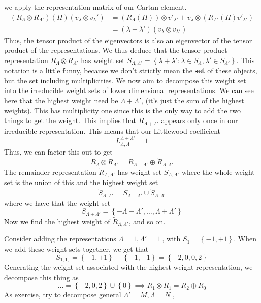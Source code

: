 we apply the representation matrix of our Cartan element. 
\begin{align*}
	( R _{ \Lambda } \otimes R _{ \Lambda ' })  ( H ) ( v _ \lambda \otimes v _{ \lambda } ' ) 
	&=  ( R _ \Lambda ( H ) ) \otimes v ' _{ \lambda '   } + v _ \lambda \otimes ( R _{ \Lambda ' 
	} ( H ) v ' _{ \lambda ' } ) \\
					&=  ( \lambda + \lambda ' ) ( v _ \lambda \otimes v _{ \lambda ' } )
\end{align*}
Thus, the tensor 
product of the eigenvectors is also an eigenvector 
of the tensor product of the representations. 
We thus deduce that the tensor product representation 
$ R_{ \Lambda } \otimes R _{ \Lambda ' } $ has weight set 
$ S _{ \Lambda , \Lambda ' }  = \left\{  \lambda + \lambda ' 
: \lambda \in S _{ \Lambda } , \lambda ' \in S _{ \Lambda ' } \right\} $. 
This notation is a little funny, because we don't strictly 
mean the \textbf{set} of these objects, but the set including multiplicities. 
We now aim to decompose this weight set 
into the irreducible weight sets of lower dimensional representations.  
We can see here that the highest weight need be $ \Lambda   + \Lambda ' $, 
(it's just the sum of the highest weights). This has multiplicity one since 
this is the only way to add the two things to get the weight. 
This implies that $ R _{ \Lambda + \Lambda ' } $ appears only 
once in our irreducible representation. This means 
that our Littlewood coefficient 
\[
 L ^{ \Lambda + \Lambda ' } _{ \Lambda , \Lambda }  =1 
\] Thus, we can factor this out to get 
\[
 R_{ \Lambda } \otimes R_{ \Lambda ' } = R _{ \Lambda + \Lambda ' } \oplus \tilde{ R } _{ \Lambda , \Lambda ' } 
\] The remainder representation 
$ \tilde{ R  } _{ \Lambda, \Lambda ' }  $ has weight set 
$  \tilde{ S } _{ \Lambda , \Lambda ' }  $ where 
the whole weight set is the union of this and the highest weight set 
\[
 \tilde{ S } _{ \Lambda , \Lambda ' }  = S _{ \Lambda + \Lambda'   }  \cup \tilde{ S  } _{ \Lambda, \Lambda ' }
\] where we have that 
the weight set 
\[
 S _{ \Lambda + \Lambda'  }  = \left\{   - \Lambda - \Lambda ' , \dots , \Lambda + \Lambda '  \right\} 
\]  Now we find the highest weight of $ \tilde{ R  } _{ \Lambda , \Lambda ' }  $, 
and so on. 

\begin{example}
	Consider adding the representations $ \Lambda  = 1, \Lambda ' = 1 $ , with 
	$ S _ 1= \left\{  - 1, + 1  \right\} $. 
	When we add these weight sets together, we get that 
	\[
	 S _{ 1, 1, } = \left\{  - 1, + 1 \right\}  + \left\{  -1, + 1  \right\}   = \left\{  - 2 , 
	 0 , 0 , 2 \right\}  
	\] Generating the weight set associated with the highest weight representation, 
	we decompose this thing as 
	\[
	 \dots = \left\{  - 2, 0 , 2  \right\} \cup \left\{  0  \right\}  \implies 
	 R_ 1 \otimes R_ 1  = R_ 2 \oplus R _ 0 
	\] As exercise, try to decompose general $ \Lambda' = M , \Lambda = N $ , 

\end{example}
 

\pagebreak 
